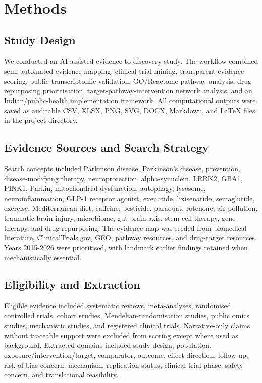 \documentclass{article}
\begin{document}
\section{Methods}

\subsection{Study Design}

We conducted an AI-assisted evidence-to-discovery study. The workflow combined semi-automated evidence mapping, clinical-trial mining, transparent evidence scoring, public transcriptomic validation, GO/Reactome pathway analysis, drug-repurposing prioritisation, target-pathway-intervention network analysis, and an Indian/public-health implementation framework. All computational outputs were saved as auditable CSV, XLSX, PNG, SVG, DOCX, Markdown, and LaTeX files in the project directory.


\subsection{Evidence Sources and Search Strategy}

Search concepts included Parkinson disease, Parkinson's disease, prevention, disease-modifying therapy, neuroprotection, alpha-synuclein, LRRK2, GBA1, PINK1, Parkin, mitochondrial dysfunction, autophagy, lysosome, neuroinflammation, GLP-1 receptor agonist, exenatide, lixisenatide, semaglutide, exercise, Mediterranean diet, caffeine, pesticide, paraquat, rotenone, air pollution, traumatic brain injury, microbiome, gut-brain axis, stem cell therapy, gene therapy, and drug repurposing. The evidence map was seeded from biomedical literature, ClinicalTrials.gov, GEO, pathway resources, and drug-target resources. Years 2015-2026 were prioritised, with landmark earlier findings retained when mechanistically essential.


\subsection{Eligibility and Extraction}

Eligible evidence included systematic reviews, meta-analyses, randomised controlled trials, cohort studies, Mendelian-randomisation studies, public omics studies, mechanistic studies, and registered clinical trials. Narrative-only claims without traceable support were excluded from scoring except where used as background. Extracted domains included study design, population, exposure/intervention/target, comparator, outcome, effect direction, follow-up, risk-of-bias concern, mechanism, replication status, clinical-trial phase, safety concern, and translational feasibility.
\end{document}
